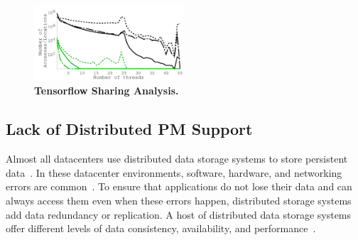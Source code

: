 \documentclass[sigconf]{acmart}
\newcommand{\DIFaddFL}[1]{}
\renewcommand{\em}{\it}
\newcommand{\mycaption}[3]{\caption{\label{#1}{\bf #2} \em\small #3}}
\providecommand{\DIFadd}[1]{{\protect\color{blue}\uwave{#1}}} %
\providecommand{\DIFaddbegin}{} %
\providecommand{\DIFaddend}{} %
\providecommand{\DIFdelbegin}{} %
\providecommand{\DIFdelend}{} %
\providecommand{\DIFaddFL}[1]{\DIFadd{#1}} %
\begin{document}
\DIFdelbegin %
\DIFdelend \DIFaddbegin {
\begin{figure}[th]
\begin{center}
\centerline{\includegraphics[width=0.5\textwidth]{Figures/g_plot_tensorflow_average.pdf}}
\mycaption{fig-tensorflow}{Tensorflow Sharing Analysis.}
{
\DIFaddFL{Results of running a hand-writing recognition workloads provided by TensorFlow.
Black lines represent total amount of sharing.
Green lines represent sharing within five seconds.
}}
\end{center}
\end{figure}
}

\DIFaddend \subsection{Lack of Distributed PM Support}
\DIFdelbegin %
\DIFdelend {}
Almost all datacenters use distributed data storage systems to store persistent data~\cite{AdyaEtAl-Farsite,calder11-azure,DeCandia+07-Dynamo,Ghemawat03-GoogleFS,KubiEtAl00-Ocean,Petersen97-Bayou}.
In these datacenter environments, software, hardware, and networking errors 
are common~\cite{ford2010availability,nath06-subtleties}. 
To ensure that applications do not lose their data and can always access them even when these errors happen, 
distributed storage systems 
add data redundancy or replication. 
A host of distributed data storage systems  
offer different levels of data consistency, availability, 
and performance~\cite{AdyaEtAl-Farsite,calder11-azure,DeCandia+07-Dynamo,Ghemawat03-GoogleFS,KubiEtAl00-Ocean,Petersen97-Bayou}.
\fi
\DIFaddbegin 
\end{document}
